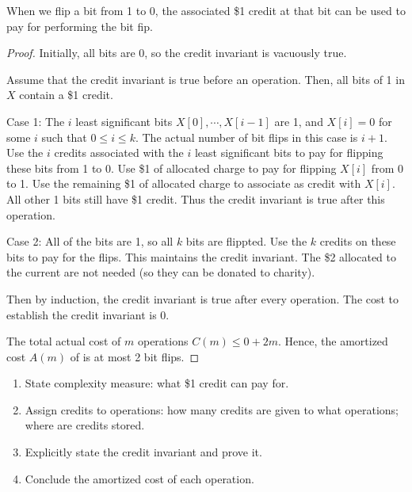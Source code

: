 When we flip a bit from 1 to 0, the associated \$1 credit at that bit can be used to pay for performing the bit fip.

\begin{proof}
    Initially, all bits are 0, so the credit invariant is vacuously true.

    Assume that the credit invariant is true before an  operation. Then, all bits of 1 in $X$ contain a \$1 credit.

    Case 1: The $i$ least significant bits $X[0],\cdots,X[i-1]$ are 1, and $X[i] = 0$ for some $i$ such that $0 \leq i \leq k$. The actual number of bit flips in this case is $i+1$. Use the $i$ credits associated with the $i$ least significant bits to pay for flipping these bits from 1 to 0. Use \$1 of allocated charge to pay for flipping $X[i]$ from 0 to 1. Use the remaining \$1 of allocated charge to associate as credit with $X[i]$. All other 1 bits still have \$1 credit. Thus the credit invariant is true after this  operation.

    Case 2: All of the bits are 1, so all $k$ bits are flippted. Use the $k$ credits on these bits to pay for the flips. This maintains the credit invariant. The \$2 allocated to the current  are not needed (so they can be donated to charity).

    Then by induction, the credit invariant is true after every  operation. The cost to establish the credit invariant is 0.

    The total actual cost of $m$ operations $C(m) \leq 0 + 2m$. Hence, the amortized cost $A(m)$ of  is at most 2 bit flips.  
\end{proof}

\begin{thmrule}

    \hfill

    \begin{enumerate}
        \item State complexity measure: what \$1 credit can pay for.
        \item Assign credits to operations: how many credits are given to what operations; where are credits stored.
        \item Explicitly state the credit invariant and prove it.
        \item Conclude the amortized cost of each operation.
    \end{enumerate}
\end{thmrule}

